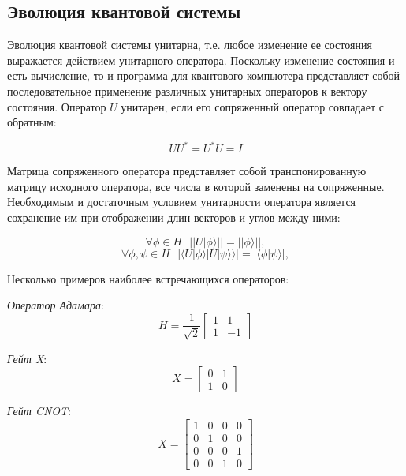 \documentclass[14pt]{article}
\begin{document}
	\newpage
	\subsection{Эволюция квантовой системы}
	
	Эволюция квантовой системы унитарна, т.е. любое изменение
ее состояния выражается действием унитарного оператора. Поскольку изменение состояния и есть вычисление, то и программа для квантового компьютера представляет собой последовательное применение различных унитарных операторов к вектору состояния.
Оператор $U$ унитарен, если его сопряженный оператор совпадает с обратным:

	\begin{equation}
	UU^* = U^*U = I
	\end{equation}
	
	Матрица сопряженного оператора представляет собой
транспонированную матрицу исходного оператора, все числа
в которой заменены на сопряженные.
Необходимым и достаточным условием унитарности оператора является сохранение им при отображении длин векторов и углов между ними:

	\begin{equation}
	\forall \phi \in H \text{    } || U|\phi \rangle || = || \phi \rangle ||,
	\end{equation}
	\begin{equation}
	\forall \phi, \psi \in H \text{    } | \langle U|\phi \rangle | U|\psi \rangle \rangle | = | \langle \phi | \psi \rangle |,
	\end{equation}
	
	Несколько примеров наиболее встречающихся операторов:
	
	\textit{Оператор Адамара}:
	\begin{equation}
	H = \frac{1}{\sqrt{2}} \begin{bmatrix} 1 & 1 \\ 1 & -1 \end{bmatrix}
	\end{equation}

	\textit{Гейт X}:
	\begin{equation}
	X = \begin{bmatrix} 0 & 1 \\ 1 & 0 \end{bmatrix}
	\end{equation}	
	
	\textit{Гейт CNOT}:
	\begin{equation}
	X = \begin{bmatrix} 1 & 0 & 0 & 0 \\ 0 & 1 & 0 & 0 \\ 0 & 0 & 0 & 1 \\ 0 & 0 & 1 & 0 \end{bmatrix}
	\end{equation}	
\end{document}
